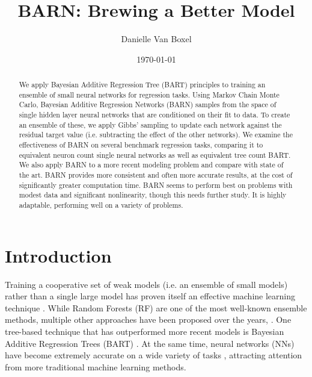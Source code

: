 \documentclass[12pt]{article}
\title{BARN: Brewing a Better Model}
\author{Danielle Van Boxel}
\date{\today}
\begin{document}
\maketitle

\begin{abstract}

    We apply Bayesian Additive Regression Tree (BART) principles to training an ensemble of small neural networks for regression tasks.  Using Markov Chain Monte Carlo, Bayesian Additive Regression Networks (BARN) samples from the space of single hidden layer neural networks that are conditioned on their fit to data.  To create an ensemble of these, we apply Gibbs' sampling to update each network against the residual target value (i.e. subtracting the effect of the other networks).  We examine the effectiveness of BARN on several benchmark regression tasks, comparing it to equivalent neuron count single neural networks as well as equivalent tree count BART.  We also apply BARN to a more recent modeling problem and compare with state of the art.  BARN provides more consistent and often more accurate results, at the cost of significantly greater computation time.  BARN seems to perform best on problems with modest data and significant nonlinearity, though this needs further study.  It is highly adaptable, performing well on a variety of problems.
\end{abstract}

\section{Introduction}\label{sec:intro}


Training a cooperative set of weak models (i.e. an ensemble of small models) rather than a single large model has proven itself an effective machine learning technique \cite{dietterich2000ensemble,hansen1990neural,seni2010ensemble,lee2020comparing}.  While Random Forests (RF) \cite{ho1995random,breiman2001random} are one of the most well-known ensemble methods, multiple other approaches have been proposed over the years, \cite[provide some reviews]{way2012advances,dong2020survey}.  One tree-based technique that has outperformed more recent models \cite{biau2019neural} is Bayesian Additive Regression Trees (BART) \cite{chipman2010bart}.  At the same time, neural networks (NNs) have become extremely accurate on a wide variety of tasks \cite{schmidhuber2015deep}, attracting attention from more traditional machine learning methods.
\end{document}
